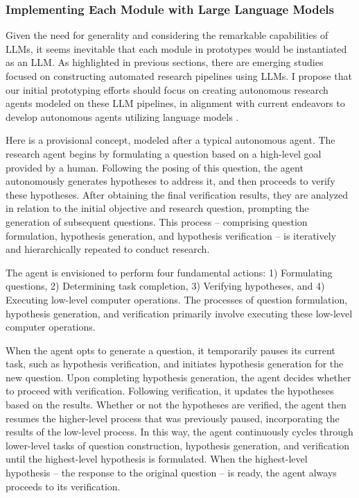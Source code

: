 \documentclass{article}
\begin{document}
\subsubsection{Implementing Each Module with Large Language Models}

Given the need for generality and considering the remarkable capabilities of LLMs, it seems inevitable that each module in prototypes would be instantiated as an LLM. As highlighted in previous sections, there are emerging studies focused on constructing automated research pipelines using LLMs. I propose that our initial prototyping efforts should focus on creating autonomous research agents modeled on these LLM pipelines, in alignment with current endeavors to develop autonomous agents utilizing language models \cite{wang2023survey,xi2023rise}.

Here is a provisional concept, modeled after a typical autonomous agent. The research agent begins by formulating a question based on a high-level goal provided by a human. Following the posing of this question, the agent autonomously generates hypotheses to address it, and then proceeds to verify these hypotheses. After obtaining the final verification results, they are analyzed in relation to the initial objective and research question, prompting the generation of subsequent questions. This process – comprising question formulation, hypothesis generation, and hypothesis verification – is iteratively and hierarchically repeated to conduct research.

The agent is envisioned to perform four fundamental actions: 1) Formulating questions, 2) Determining task completion, 3) Verifying hypotheses, and 4) Executing low-level computer operations. The processes of question formulation, hypothesis generation, and verification primarily involve executing these low-level computer operations.

When the agent opts to generate a question, it temporarily pauses its current task, such as hypothesis verification, and initiates hypothesis generation for the new question. Upon completing hypothesis generation, the agent decides whether to proceed with verification. Following verification, it updates the hypotheses based on the results. Whether or not the hypotheses are verified, the agent then resumes the higher-level process that was previously paused, incorporating the results of the low-level process. In this way, the agent continuously cycles through lower-level tasks of question construction, hypothesis generation, and verification until the highest-level hypothesis is formulated. When the highest-level hypothesis – the response to the original question – is ready, the agent always proceeds to its verification.
\end{document}
